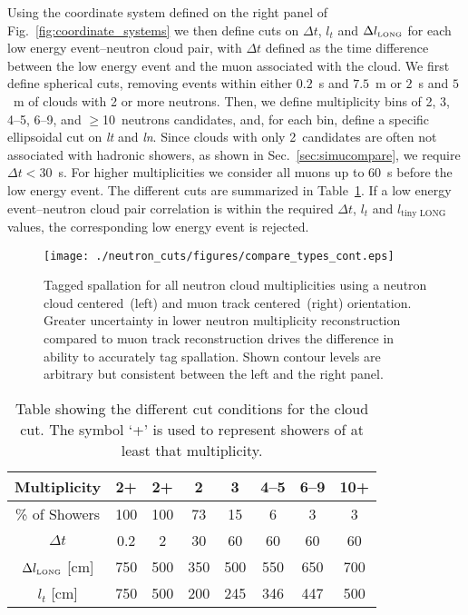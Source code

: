 Using the coordinate system defined on the right panel of Fig.~\ref{fig:coordinate_systems} we then define cuts on $\Delta t$, $l_t$ and $\Delta l_{\mbox{\tiny LONG}}$ for each low energy event--neutron cloud pair, with $\Delta t$ defined as the time difference between the low energy event and the muon associated with the cloud. We first define spherical cuts, removing events within either $0.2$~s and $7.5$~m or $2$~s and $5$~m of clouds with 2 or more neutrons. Then, we define multiplicity bins of 2, 3, 4--5, 6--9, and $\geq$10~neutrons candidates, and, for each bin, define a specific ellipsoidal cut on {\it lt} and {\it ln}. Since clouds with only 2~candidates are often not associated with hadronic showers, as shown in Sec.~\ref{sec:simucompare}, we require $\Delta t < 30$~s. For higher multiplicities we consider all muons up to 60~s before the low energy event. The different cuts are summarized in Table~\ref{tab:cloudtab}. If a low energy event--neutron cloud pair correlation is within the required $\Delta t$, $l_t$ and $l_{\mbox{tiny LONG}}$ values, the corresponding low energy event is rejected.

\begin{figure*}
    \centering
    \texttt{[image: ./neutron\_cuts/figures/compare\_types\_cont.eps]}
    \caption{Tagged spallation for all neutron cloud multiplicities using a neutron cloud centered~(left) and muon track centered~(right) orientation. Greater uncertainty in lower neutron multiplicity reconstruction compared to muon track reconstruction drives the difference in ability to accurately tag spallation. Shown contour levels are arbitrary but consistent between the left and the right panel.}
    \label{fig:neutmuoncomp}
\end{figure*}

\begin{table}[t]
    \centering
        \caption{Table showing the different cut conditions for the cloud cut. The symbol `+' is used to represent showers of at least that multiplicity.}
    \begin{tabular}{ c*{6}{c}c }
    \toprule Multiplicity  & 2+ & 2+ & 2 & 3 & 4--5 & 6--9 & 10+ \\\hline
    \% of Showers & 100 & 100 & 73 & 15 & 6 & 3 & 3  \\\hline
    $\Delta t$  & 0.2 & 2 & 30 & 60 & 60 & 60 & 60 \\\hline
    $\Delta l_{\mbox{\tiny LONG}}$ [cm] & 750 & 500 & 350 & 500 & 550 & 650 & 700  \\\hline
    $l_t$ [cm] & 750 & 500 & 200 & 245 & 346 & 447 & 500 \\\bottomrule        %
    \end{tabular}
    \label{tab:cloudtab}
\end{table}

